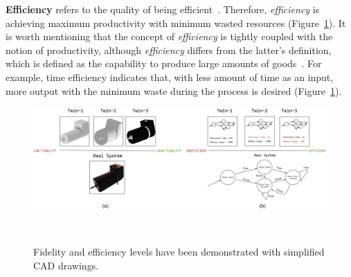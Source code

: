 \documentclass{llncs}
\begin{document}
    \textbf{Efficiency} refers to the quality of being efficient~\cite{OxfordDictionary}. 
    Therefore, \textit{efficiency} is achieving maximum productivity with minimum wasted resources (Figure~\ref{fig:EfficiencyandFidelity}). 
    It is worth mentioning that the concept of \textit{efficiency} is tightly coupled with the notion of productivity, 
    although \textit{efficiency} differs from the latter's definition, which is defined as the capability to produce large amounts of goods~\cite{OxfordDictionary}.  
    For example, time efficiency indicates that,  with less amount of time as an input, more output with the minimum waste during the process is desired (Figure~\ref{fig:EfficiencyandFidelity}).
    \begin{figure}[htbp]
        \centering
        \includegraphics[width = 1\textwidth]{Efficiency and Fidelity.png}
        \caption{Fidelity and efficiency levels have been demonstrated with simplified CAD drawings.}~\label{fig:EfficiencyandFidelity}
    \end{figure}
\end{document}
